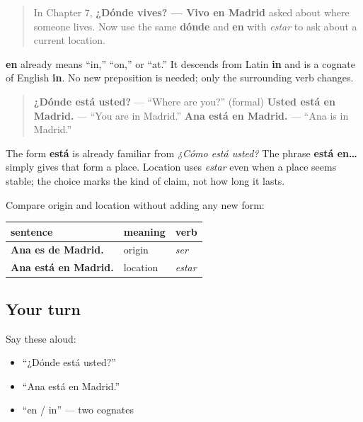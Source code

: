\begin{quote}
In Chapter 7, \textbf{¿Dónde vives? — Vivo en Madrid} asked about where someone lives. Now use the same \textbf{dónde} and \textbf{en} with \emph{estar} to ask about a current location.
\end{quote}

\begin{cousinweb}
\textbf{en} already means “in,” “on,” or “at.” It descends from Latin \textbf{in} and is a cognate of English \textbf{in}. No new preposition is needed; only the surrounding verb changes.
\end{cousinweb}

\begin{grammarlens}[title={Grammar Lens: dónde + estar, then estar + en}]
\begin{quote}
\textbf{¿Dónde está usted?} — “Where are you?” (formal) \textbf{Usted está en Madrid.} — “You are in Madrid.” \textbf{Ana está en Madrid.} — “Ana is in Madrid.”
\end{quote}

The form \textbf{está} is already familiar from \emph{¿Cómo está usted?} The phrase \textbf{está en…} simply gives that form a place. Location uses \emph{estar} even when a place seems stable; the choice marks the kind of claim, not how long it lasts.

Compare origin and location without adding any new form:

\noindent
\begin{tabularx}{\linewidth}{@{}>{\raggedright\arraybackslash}X>{\raggedright\arraybackslash}X>{\raggedright\arraybackslash}X@{}}
\toprule
\textbf{sentence} & \textbf{meaning} & \textbf{verb} \\
\midrule
\textbf{Ana es de Madrid.} & origin & \emph{ser} \\
\textbf{Ana está en Madrid.} & location & \emph{estar} \\
\bottomrule
\end{tabularx}
\end{grammarlens}

\subsection*{Your turn}
Say these aloud:

\begin{itemize}
\raggedright
  \item “¿Dónde está usted?”
  \item “Ana está en Madrid.”
  \item “en / in” — two cognates
\end{itemize}

